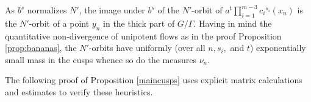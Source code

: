 \documentclass[10pt,reqno]{amsart}
\theoremstyle{Theorem}
\theoremstyle{definition}
\theoremstyle{remark}
\newcommand{\R}{\mathbb {R}}
\newcommand{\Z}{\mathbb {Z}}
\newcommand{\T}{\mathbb {T}}
\newcommand{\Sl}{\mathrm{SL}}
\begin{document}

 As $b^s$ normalizes $N'$, the image under $b^s$ of the $N'$-orbit of $a^t\prod_{i=1}^{m-3}{c_i}^{s_i}(x_n)$ is the $N'$-orbit of a point $y_n$ in the thick part of $G/\Gamma$.
 Having in mind the quantitative non-divergence of unipotent flows as in the proof Proposition \ref{prop:bananas},   the $N'$-orbits  have uniformly (over all $n, s_i, $ and $t$) exponentially small mass in the cusps whence so do the measures $\nu_n$. %


 The following  proof of  Proposition \ref{maincusps} uses   explicit matrix calculations and estimates to verify  these heuristics.


\end{document}
